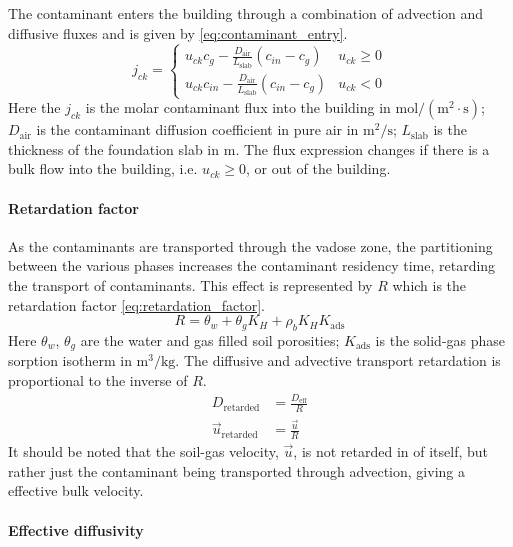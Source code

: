 The contaminant enters the building through a combination of advection and diffusive fluxes and is given by \eqref{eq:contaminant_entry}.
\begin{equation}\label{eq:contaminant_entry}
  j_{ck} = \begin{cases}
    u_{ck} c_g - \frac{D_\mathrm{air}}{L_\mathrm{slab}} (c_{in} - c_g) & u_{ck} \geq 0 \\
    u_{ck} c_{in} - \frac{D_\mathrm{air}}{L_\mathrm{slab}} (c_{in} - c_g) & u_{ck} < 0
\end{cases}
\end{equation}
Here the $j_{ck}$ is the molar contaminant flux into the building in $\mathrm{mol/(m^2 \cdot s)}$;
$D_\mathrm{air}$ is the contaminant diffusion coefficient in pure air in $\mathrm{m^2/s}$;
$L_\mathrm{slab}$ is the thickness of the foundation slab in $\mathrm{m}$.
The flux expression changes if there is a bulk flow into the building, i.e. $u_{ck} \geq 0$, or out of the building.

\paragraph{Retardation factor}

As the contaminants are transported through the vadose zone, the partitioning between the various phases increases the contaminant residency time, retarding the transport of contaminants.
This effect is represented by $R$ which is the retardation factor \eqref{eq:retardation_factor}.
\begin{equation}\label{eq:retardation_factor}
  R = \theta_w + \theta_g K_H + \rho_b K_H K_\mathrm{ads}
\end{equation}
Here $\theta_w$, $\theta_g$ are the water and gas filled soil porosities;
$K_\mathrm{ads}$ is the solid-gas phase sorption isotherm in $\mathrm{m^3/kg}$.
The diffusive and advective transport retardation is proportional to the inverse of $R$.
\begin{align}
  D_\mathrm{retarded} &= \frac{D_\mathrm{eff}}{R} \\
  \vec{u}_\mathrm{retarded} &= \frac{\vec{u}}{R}
\end{align}
It should be noted that the soil-gas velocity, $\vec{u}$, is not retarded in of itself, but rather just the contaminant being transported through advection, giving a effective bulk velocity.\par

\paragraph{Effective diffusivity}


